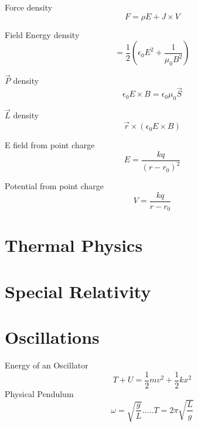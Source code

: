 \documentclass{article}
\begin{document}
Force density\begin{equation}F=\rho E + J\times V\end{equation}

Field Energy density\begin{equation}=\frac{1}{2} (\epsilon_0 E^2 + \frac{1}{\mu_0 B^2})\end{equation}

$\vec{P}$ density \begin{equation}\epsilon_0 E \times B = \epsilon_0 \mu_0 \vec{S}\end{equation}

$\vec{L}$ density\begin{equation}\vec{r}\times (\epsilon_0 E \times B)\end{equation}

E field from point charge\begin{equation}E=\frac{kq}{(r-r_0)^2}\end{equation}

Potential from point charge\begin{equation}V=\frac{kq}{r-r_0}\end{equation}










\section{Thermal Physics}









\section{Special Relativity}









\section{Oscillations}
Energy of an Oscillator\begin{equation}T+U=\frac{1}{2}mv^2 + \frac{1}{2}kx^2\end{equation}
Physical Pendulum\begin{equation}\omega = \sqrt{\frac{g}{L}}.....T=2\pi \sqrt{\frac{L}{g}}\end{equation}
\end{document}
